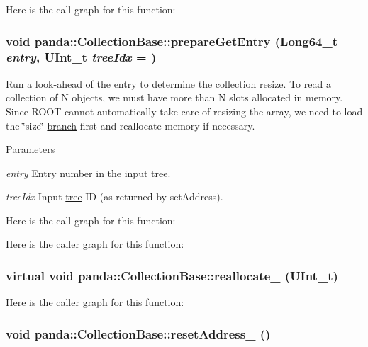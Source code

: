 Here is the call graph for this function:\hypertarget{classpanda_1_1CollectionBase_a217c39578bc5e0e7e2b6ebf44bf93cdd}{
\subsubsection[{prepareGetEntry}]{\setlength{\rightskip}{0pt plus 5cm}void panda::CollectionBase::prepareGetEntry (Long64\_\-t {\em entry}, \/  UInt\_\-t {\em treeIdx} = {})}}
\label{classpanda_1_1CollectionBase_a217c39578bc5e0e7e2b6ebf44bf93cdd}


\hyperlink{classpanda_1_1Run}{Run} a look-\/ahead of the entry to determine the collection resize. To read a collection of N objects, we must have more than N slots allocated in memory. Since ROOT cannot automatically take care of resizing the array, we need to load the \char`\"{}size\char`\"{} \hyperlink{namespacepanda_1_1branch}{branch} first and reallocate memory if necessary.


\begin{DoxyParams}{Parameters}
\item[{\em entry}]Entry number in the input \hyperlink{namespacepanda_1_1tree}{tree}. \item[{\em treeIdx}]Input \hyperlink{namespacepanda_1_1tree}{tree} ID (as returned by setAddress). \end{DoxyParams}


Here is the call graph for this function:

Here is the caller graph for this function:\hypertarget{classpanda_1_1CollectionBase_a89b2268e4b665eb8f1fa5b54d4c61c32}{
\subsubsection[{reallocate\_\-}]{\setlength{\rightskip}{0pt plus 5cm}virtual void panda::CollectionBase::reallocate\_\- (UInt\_\-t)}}
\label{classpanda_1_1CollectionBase_a89b2268e4b665eb8f1fa5b54d4c61c32}


Here is the caller graph for this function:\hypertarget{classpanda_1_1CollectionBase_a4d6bc9cc77ee3e29840362826b108b23}{
\subsubsection[{resetAddress\_\-}]{\setlength{\rightskip}{0pt plus 5cm}void panda::CollectionBase::resetAddress\_\- ()}}
\label{classpanda_1_1CollectionBase_a4d6bc9cc77ee3e29840362826b108b23}


